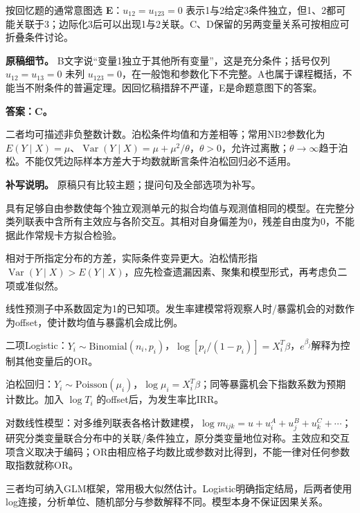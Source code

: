 按回忆题的通常意图选 \textbf{E}：\(u_{12}=u_{123}=0\) 表示1与2给定3条件独立，但1、2都可能关联于3；边际化3后可以出现1与2关联。C、D保留的另两变量关系可按相应可折叠条件讨论。

\textbf{原稿细节。} B文字说``变量1独立于其他所有变量''，这是充分条件；括号仅列 \(u_{12}=u_{13}=0\) 未列 \(u_{123}=0\)，在一般饱和参数化下不完整。A也属于课程概括，不能当不附条件的普遍定理。因回忆稿措辞不严谨，E是命题意图下的答案。



\textbf{答案：C。}

二者均可描述非负整数计数。泊松条件均值和方差相等；常用NB2参数化为 \(E(Y\mid X)=\mu\)、\(\operatorname{Var}(Y\mid X)=\mu+\mu^2/\theta\)，\(\theta>0\)，允许过离散；\(\theta\to\infty\)趋于泊松。不能仅凭边际样本方差大于均数就断言条件泊松回归必不适用。

\textbf{补写说明。} 原稿只有比较主题；提问句及全部选项为补写。



具有足够自由参数使每个独立观测单元的拟合均值与观测值相同的模型。在完整分类列联表中含所有主效应与各阶交互。其相对自身偏差为0，残差自由度为0，不能据此作常规卡方拟合检验。



相对于所指定分布的方差，实际条件变异更大。泊松情形指 \(\operatorname{Var}(Y\mid X)>E(Y\mid X)\)，应先检查遗漏因素、聚集和模型形式，再考虑负二项或准似然。



线性预测子中系数固定为1的已知项。发生率建模常将观察人时/暴露机会的对数作为offset，使计数均值与暴露机会成比例。



二项Logistic：\(Y_i\sim\mathrm{Binomial}(n_i,p_i)\)，\(\log[p_i/(1-p_i)]=X_i^T\beta\)，\(e^{\beta_j}\)解释为控制其他变量后的OR。

泊松回归：\(Y_i\sim\mathrm{Poisson}(\mu_i)\)，\(\log\mu_i=X_i^T\beta\)；同等暴露机会下指数系数为预期计数比。加入 \(\log T_i\) 的offset后，为发生率比IRR。

对数线性模型：对多维列联表各格计数建模，\(\log m_{ijk}=u+u_i^A+u_j^B+u_k^C+\cdots\)；研究分类变量联合分布中的关联/条件独立，原分类变量地位对称。主效应和交互项含义取决于编码；OR由相应格子均数比或参数对比得到，不能一律对任何参数取指数就称OR。

三者均可纳入GLM框架，常用极大似然估计。Logistic明确指定结局，后两者使用log连接，分析单位、随机部分与参数解释不同。模型本身不保证因果关系。


